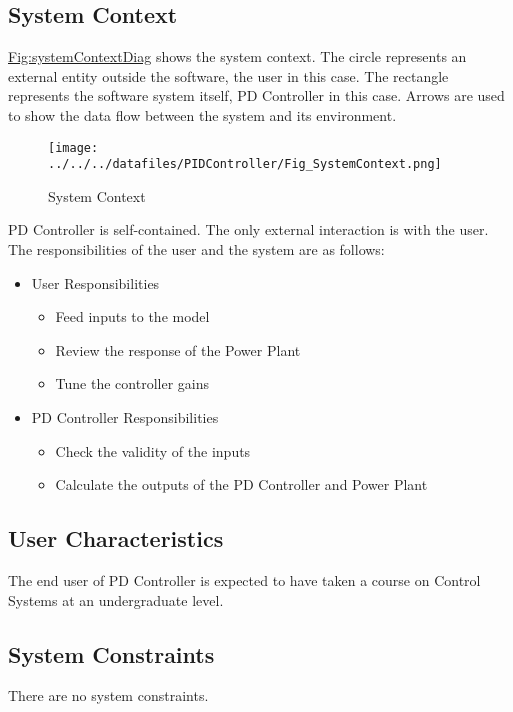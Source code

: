 \documentclass[12pt]{article}
\begin{document}
\subsection{System Context}
\label{Sec:SysContext}
\hyperref[Figure:systemContextDiag]{Fig:systemContextDiag} shows the system context. The circle represents an external entity outside the software, the user in this case. The rectangle represents the software system itself, PD Controller in this case. Arrows are used to show the data flow between the system and its environment.

\begin{figure}
\begin{center}
\texttt{[image: ../../../datafiles/PIDController/Fig\_SystemContext.png]}
\caption{System Context}
\label{Figure:systemContextDiag}
\end{center}
\end{figure}
PD Controller  is self-contained. The only external interaction is   with the user. The responsibilities of the  user  and the  system  are as follows:

\begin{itemize}
\item{User Responsibilities}
\begin{itemize}
\item{Feed inputs to the model}
\item{Review the response of the  Power Plant}
\item{Tune the controller gains}
\end{itemize}
\item{PD Controller Responsibilities}
\begin{itemize}
\item{Check the validity of the inputs}
\item{Calculate the outputs of the  PD Controller  and  Power Plant}
\end{itemize}
\end{itemize}
\subsection{User Characteristics}
\label{Sec:UserChars}
The end user of  PD Controller  is expected to have taken a course on Control Systems at an  undergraduate level.

\subsection{System Constraints}
\label{Sec:SysConstraints}
There are no system constraints.
\end{document}
